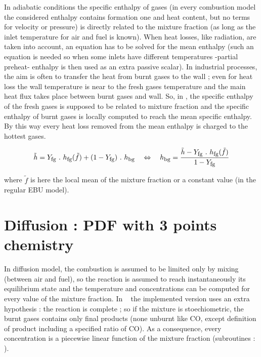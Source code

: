 In adiabatic conditions the specific enthalpy of gases ({\small in every
  combustion model the considered enthalpy contains formation one and heat
  content, but no terms for velocity or pressure}) is directly related to the
mixture fraction ({\small as long as the inlet temperature for air and fuel is
  known}). When heat losses, like radiation, are taken into account, an equation
has to be solved for the mean enthalpy ({\small such an equation is needed so
  when some inlets have different temperatures -partial preheat- enthalpy is
  then used as an extra passive scalar}). In industrial processes, the aim is
often to transfer the heat from burnt gases to the wall ; even for heat loss the
wall temperature is near to the fresh gases temperature and the main heat flux
takes place between burnt gases and wall. So, in \CS, the specific enthalpy of
the fresh gases is supposed to be related to mixture fraction and the specific
enthalpy of burnt gases is locally computed to reach the mean specific
enthalpy. By this way every heat loss removed from the mean enthalpy is charged
to the hottest gases.

\begin{equation}
\tilde h = Y_{\mbox{\footnotesize fg}}~.~h_{\mbox{\footnotesize fg}}( \tilde f) + (1-Y_{\mbox{\footnotesize fg}})~.~h_{\mbox{\footnotesize bg}} \quad \Leftrightarrow \quad  
                  h_{\mbox{\footnotesize bg}}  = \frac{ \tilde h-Y_{\mbox{\footnotesize fg}}~.~h_{\mbox{\footnotesize fg}}(\tilde f) }{ 1-Y_{\mbox{\footnotesize fg}} }  
\end{equation}

where $\tilde f$ is here the local mean of the mixture fraction or a constant value ({\small in the regular EBU model}).  

\section*{Diffusion : PDF with 3 points chemistry}
 
In diffusion model, the combustion is assumed to be limited only by mixing
(between air and fuel), so the reaction is assumed to reach instantaneously its
equilibrium state and the temperature and concentrations can be computed for
every value of the mixture fraction.  In \CS~ the implemented version uses an
extra hypothesis : the reaction is complete ; so if the mixture is
stoechiometric, the burnt gases contains only final products (none unburnt like
CO, except definition of product including a specified ratio of CO).  As a
consequence, every concentration is a piecewise linear function of the mixture
fraction (subroutines : ).
 
